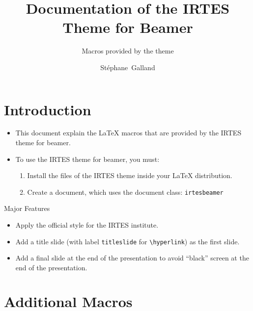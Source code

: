 \documentclass[english,circlenumberstyle]{irtesbeamer}
\title{Documentation of the IRTES Theme for Beamer}
\subtitle{Macros provided by the theme}
\author[S.~Galland]{St\'ephane~Galland}
\begin{document}
\tableofcontentslide

\section{Introduction}
\begin{frame}{\secname}
	\begin{itemize}
	\item This document explain the {\LaTeX} macros that are provided by the IRTES theme for beamer.
	\item To use the IRTES theme for beamer, you must:
		\begin{enumerate}
		\item Install the files of the IRTES theme inside your {\LaTeX} distribution.
		\item Create a document, which uses the document class: \texttt{irtesbeamer}
		\end{enumerate}
	\end{itemize}
\end{frame}

\begin{frame}{Major Features}
	\begin{itemize}
	\item Apply the official style for the IRTES institute.
	\item Add a title slide (with label \texttt{titleslide} for \texttt{{\textbackslash}hyperlink}) as the first slide.
	\item Add a final slide at the end of the presentation to avoid ``black'' screen at the end of the presentation.
	\end{itemize}
\end{frame}

\section{Additional Macros}
\end{document}
